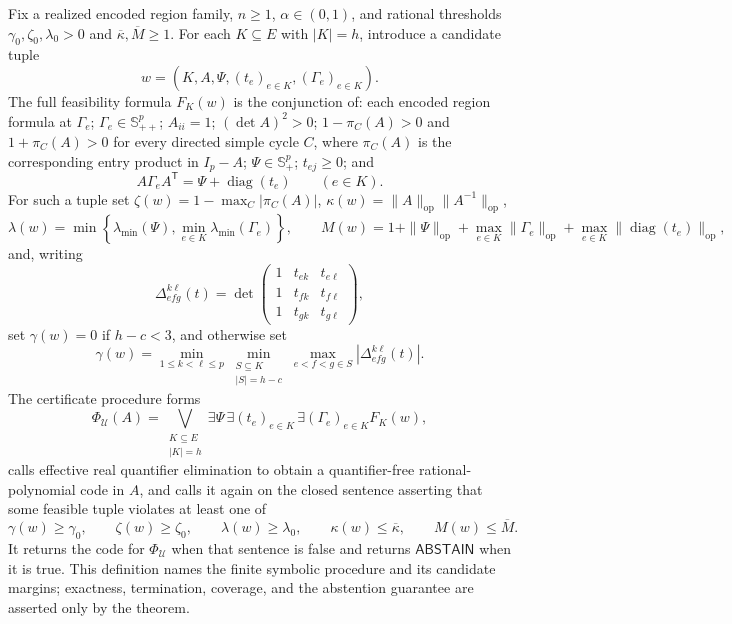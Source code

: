 Fix a realized encoded region family, \(n\geq1\), \(\alpha\in(0,1)\), and rational thresholds \(\gamma_0,\zeta_0,\lambda_0>0\) and \(\overline\kappa,\overline M\geq1\). For each \(K\subseteq E\) with \(|K|=h\), introduce a candidate tuple
\[
w=(K,A,\Psi,(t_e)_{e\in K},(\Gamma_e)_{e\in K}).
\]
The full feasibility formula \(F_K(w)\) is the conjunction of: each encoded region formula at \(\Gamma_e\); \(\Gamma_e\in\mathbb S_{++}^p\); \(A_{ii}=1\); \((\det A)^2>0\); \(1-\pi_C(A)>0\) and \(1+\pi_C(A)>0\) for every directed simple cycle \(C\), where \(\pi_C(A)\) is the corresponding entry product in \(I_p-A\); \(\Psi\in\mathbb S_+^p\); \(t_{ej}\geq0\); and
\[
A\Gamma_eA^{\mathsf T}=\Psi+\operatorname{diag}(t_e)
\qquad(e\in K).
\]
For such a tuple set \(\zeta(w)=1-\max_C|\pi_C(A)|\), \(\kappa(w)=\|A\|_{\mathrm{op}}\|A^{-1}\|_{\mathrm{op}}\),
\[
\lambda(w)=\min\left\{\lambda_{\min}(\Psi),\min_{e\in K}\lambda_{\min}(\Gamma_e)\right\},
\qquad
M(w)=1+\|\Psi\|_{\mathrm{op}}+\max_{e\in K}\|\Gamma_e\|_{\mathrm{op}}+\max_{e\in K}\|\operatorname{diag}(t_e)\|_{\mathrm{op}},
\]
and, writing
\[
\Delta^{k\ell}_{efg}(t)=
\det\begin{pmatrix}
1&t_{ek}&t_{e\ell}\\
1&t_{fk}&t_{f\ell}\\
1&t_{gk}&t_{g\ell}
\end{pmatrix},
\]
set \(\gamma(w)=0\) if \(h-c<3\), and otherwise set
\[
\gamma(w)=
\min_{1\leq k<\ell\leq p}
\min_{\substack{S\subseteq K\\|S|=h-c}}
\max_{e<f<g\in S}|\Delta^{k\ell}_{efg}(t)|.
\]
The certificate procedure forms
\[
\Phi_{\mathcal U}(A)
=\bigvee_{\substack{K\subseteq E\\|K|=h}}
\exists\Psi\,\exists(t_e)_{e\in K}\,\exists(\Gamma_e)_{e\in K} F_K(w),
\]
calls effective real quantifier elimination to obtain a quantifier-free rational-polynomial code in \(A\), and calls it again on the closed sentence asserting that some feasible tuple violates at least one of
\[
\gamma(w)\geq\gamma_0,\qquad
\zeta(w)\geq\zeta_0,\qquad
\lambda(w)\geq\lambda_0,\qquad
\kappa(w)\leq\overline\kappa,\qquad
M(w)\leq\overline M.
\]
It returns the code for \(\Phi_{\mathcal U}\) when that sentence is false and returns \(\mathsf{ABSTAIN}\) when it is true. This definition names the finite symbolic procedure and its candidate margins; exactness, termination, coverage, and the abstention guarantee are asserted only by the theorem.